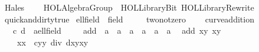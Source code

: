 %
\begin{isabellebody}%
%
%
\isadelimtheory
%
\endisadelimtheory
%
\isatagtheory
{}\isamarkupfalse%
\ Hales\isanewline
\ \ \ \ {\isachardoublequoteopen}HOL{\isacharminus}Algebra{\isachardot}Group{\isachardoublequoteclose}\ \ {\isachardoublequoteopen}HOL{\isacharminus}Library{\isachardot}Bit{\isachardoublequoteclose}\ {\isachardoublequoteopen}HOL{\isacharminus}Library{\isachardot}Rewrite{\isachardoublequoteclose}\isanewline
{}%
\endisatagtheory
{\isafoldtheory}%
%
\isadelimtheory
\isanewline
%
\endisadelimtheory
\isanewline
{}\isamarkupfalse%
\ {\isacharbrackleft}{\isacharbrackleft}quick{\isacharunderscore}and{\isacharunderscore}dirty{\isacharequal}true{\isacharbrackright}{\isacharbrackright}%
\isadelimdocument
%
\endisadelimdocument
%
\isatagdocument
%
\isamarkuptrue%
%
\endisatagdocument
{\isafolddocument}%
%
\isadelimdocument
%
\endisadelimdocument
{}\isamarkupfalse%
\ ell{\isacharunderscore}field\ {\isacharequal}\ field\ {\isacharplus}\ \isanewline
\ \ \ two{\isacharunderscore}not{\isacharunderscore}zero{\isacharcolon}\ {\isachardoublequoteopen}{}\ {\isasymnoteq}\ {}{\isachardoublequoteclose}\isanewline
\isanewline
{}\isamarkupfalse%
\ curve{\isacharunderscore}addition\ {\isacharequal}\ \ \isanewline
\ \ \ c\ d\ {\isacharcolon}{\isacharcolon}\ {\isachardoublequoteopen}{\isacharprime}a{\isacharcolon}{\isacharcolon}ell{\isacharunderscore}field{\isachardoublequoteclose}\isanewline
{}\ \ \ \isanewline
\isanewline
{}\isamarkupfalse%
\ add\ {\isacharcolon}{\isacharcolon}\ {\isachardoublequoteopen}{\isacharprime}a\ {\isasymtimes}\ {\isacharprime}a\ {\isasymRightarrow}\ {\isacharprime}a\ {\isasymtimes}\ {\isacharprime}a\ {\isasymRightarrow}\ {\isacharprime}a\ {\isasymtimes}\ {\isacharprime}a{\isachardoublequoteclose}\ \isanewline
\ {\isachardoublequoteopen}add\ {\isacharparenleft}x{}{\isacharcomma}y{}{\isacharparenright}\ {\isacharparenleft}x{}{\isacharcomma}y{}{\isacharparenright}\ {\isacharequal}\isanewline
\ \ \ \ {\isacharparenleft}{\isacharparenleft}x{}{\isacharasterisk}x{}\ {\isacharminus}\ c{\isacharasterisk}y{}{\isacharasterisk}y{}{\isacharparenright}\ div\ {\isacharparenleft}{}{\isacharminus}d{\isacharasterisk}x{}{\isacharasterisk}y{}{\isacharasterisk}x{}{\isacharasterisk}y{}{\isacharparenright}{\isacharcomma}\ \isanewline

\end{isabellebody}
